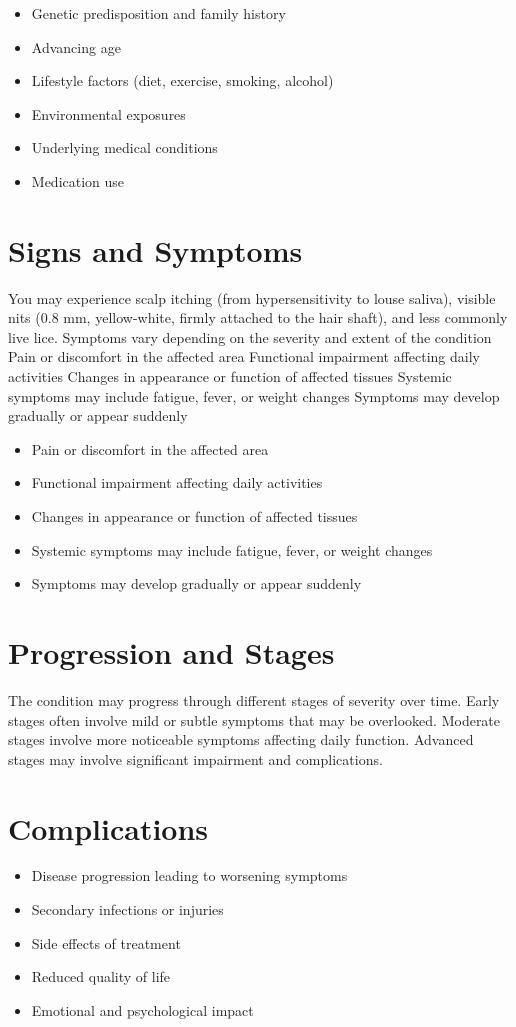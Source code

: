 \begin{itemize}[noitemsep]
  \item Genetic predisposition and family history
  \item Advancing age
  \item Lifestyle factors (diet, exercise, smoking, alcohol)
  \item Environmental exposures
  \item Underlying medical conditions
  \item Medication use
\end{itemize}
\section{Signs and Symptoms}
You may experience scalp itching (from hypersensitivity to louse saliva), visible nits (0.8 mm, yellow-white, firmly attached to the hair shaft), and less commonly live lice. Symptoms vary depending on the severity and extent of the condition Pain or discomfort in the affected area Functional impairment affecting daily activities Changes in appearance or function of affected tissues Systemic symptoms may include fatigue, fever, or weight changes Symptoms may develop gradually or appear suddenly

\begin{itemize}[noitemsep]
  \item Pain or discomfort in the affected area
  \item Functional impairment affecting daily activities
  \item Changes in appearance or function of affected tissues
  \item Systemic symptoms may include fatigue, fever, or weight changes
  \item Symptoms may develop gradually or appear suddenly
\end{itemize}
\section{Progression and Stages}
The condition may progress through different stages of severity over time. Early stages often involve mild or subtle symptoms that may be overlooked. Moderate stages involve more noticeable symptoms affecting daily function. Advanced stages may involve significant impairment and complications.
\section{Complications}
\begin{itemize}[noitemsep]
  \item Disease progression leading to worsening symptoms
  \item Secondary infections or injuries
  \item Side effects of treatment
  \item Reduced quality of life
  \item Emotional and psychological impact
\end{itemize}
